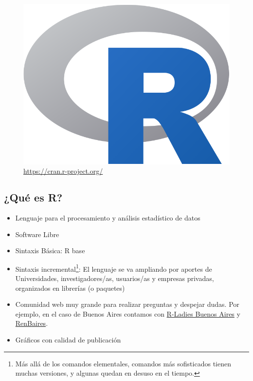 \documentclass[]{book}
\providecommand{\tightlist}{%
  \setlength{\itemsep}{0pt}\setlength{\parskip}{0pt}}
\let\rmarkdownfootnote\footnote%
\def\footnote{\protect\rmarkdownfootnote}
\begin{document}
\begin{figure}
\centering
\includegraphics[width=10.41667in,height=\textheight]{img/Rlogo.png}
\caption{\url{https://cran.r-project.org/}}
\end{figure}

\hypertarget{que-es-r}{%
\subsection{¿Qué es R?}\label{que-es-r}}

\begin{itemize}
\tightlist
\item
  Lenguaje para el procesamiento y análisis estadístico de datos
\item
  Software Libre
\item
  Sintaxis Básica: R base
\item
  Sintaxis incremental\footnote{Más allá de los comandos elementales, comandos más sofisticados tienen muchas versiones, y algunas quedan en desuso en el tiempo.}: El lenguaje se va ampliando por aportes de Universidades, investigadores/as, usuarios/as y empresas privadas, organizados en librerías (o paquetes)
\item
  Comunidad web muy grande para realizar preguntas y despejar dudas. Por ejemplo, en el caso de Buenos Aires contamos con \href{https://www.meetup.com/es-ES/rladies-buenos-aires/}{R-Ladies Buenos Aires} y \href{https://www.meetup.com/es-ES/renbaires/}{RenBaires}.
\item
  Gráficos con calidad de publicación
\end{itemize}
\end{document}
